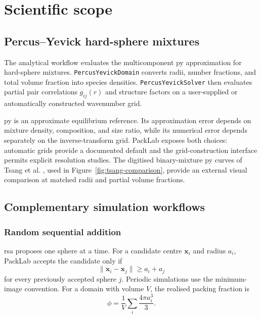 \documentclass[11pt]{article}
\begin{document}
\section{Scientific scope}

\subsection{Percus--Yevick hard-sphere mixtures}

The analytical workflow evaluates the multicomponent \gls{py} approximation for hard-sphere mixtures. %
\texttt{PercusYevickDomain} converts radii, number fractions, and total volume fraction into species densities. %
\texttt{PercusYevickSolver} then evaluates partial pair correlations $g_{ij}(r)$ and structure factors on a user-supplied or automatically constructed wavenumber grid. %

\gls{py} is an approximate equilibrium reference. Its approximation error depends on mixture density, composition, and size ratio, while its numerical error depends separately on the inverse-transform grid. %
PackLab exposes both choices: automatic grids provide a documented default and the grid-construction interface permits explicit resolution studies. %
The digitised binary-mixture \gls{py} curves of Tsang et al. \cite{Tsang2001}, used in Figure~\ref{fig:tsang-comparison}, provide an external visual comparison at matched radii and partial volume fractions. %

\subsection{Complementary simulation workflows}

\subsubsection{Random sequential addition}

\gls{rsa} proposes one sphere at a time. %
For a candidate centre $\mathbf{x}_i$ and radius $a_i$, PackLab accepts the candidate only if
\begin{equation}
	\lVert \mathbf{x}_i - \mathbf{x}_j \rVert \geq a_i + a_j
\end{equation}
for every previously accepted sphere $j$. %
Periodic simulations use the minimum-image convention. %
For a domain with volume $V$, the realised packing fraction is
\begin{equation}
	\phi = \frac{1}{V}\sum_i \frac{4\pi a_i^3}{3}. %
\end{equation}
\end{document}
